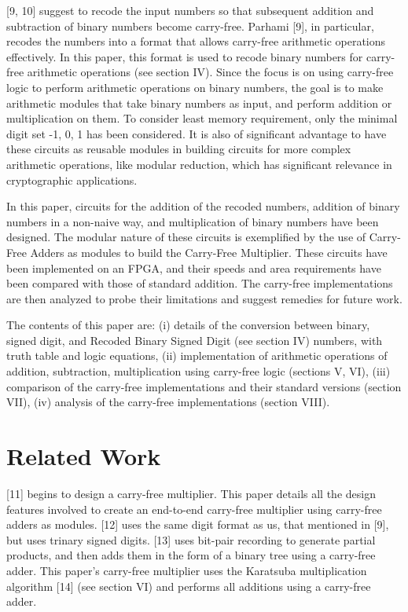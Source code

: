 \documentclass[conference]{IEEEtran_IBSS}
\begin{document}
[9, 10] suggest to recode the input numbers so that subsequent addition and subtraction of binary numbers become carry-free. Parhami [9], in particular, recodes the numbers into a format that allows carry-free arithmetic operations effectively. In this paper, this format is used to recode binary numbers for carry-free arithmetic operations (see section IV). Since the focus is on using carry-free logic to perform arithmetic operations on binary numbers, the goal is to make arithmetic modules that take binary numbers as input, and perform addition or multiplication on them. To consider least memory requirement, only the minimal digit set {-1, 0, 1} has been considered. It is also of significant advantage to have these circuits as reusable modules in building circuits for more complex arithmetic operations, like modular reduction, which has significant relevance in cryptographic applications.

In this paper, circuits for the addition of the recoded numbers, addition of binary numbers in a non-naive way, and multiplication of binary numbers have been designed. The modular nature of these circuits is exemplified by the use of Carry-Free Adders as modules to build the Carry-Free Multiplier. These circuits have been implemented on an FPGA, and their speeds and area requirements have been compared with those of standard addition. The carry-free implementations are then analyzed to probe their limitations and suggest remedies for future work.

The contents of this paper are: (i) details of the conversion between binary, signed digit, and Recoded Binary Signed Digit (see section IV) numbers, with truth table and logic equations, (ii) implementation of arithmetic operations of addition, subtraction, multiplication using carry-free logic (sections V, VI), (iii) comparison of the carry-free implementations and their standard versions (section VII), (iv) analysis of the carry-free implementations (section VIII).


\section{Related Work}

[11] begins to design a carry-free multiplier. This paper details all the design features involved to create an end-to-end carry-free multiplier using carry-free adders as modules. [12] uses the same digit format as us, that mentioned in [9], but uses trinary signed digits. [13] uses bit-pair recording to generate partial products, and then adds them in the form of a binary tree using a carry-free adder. This paper's carry-free multiplier uses the Karatsuba multiplication algorithm [14] (see section VI) and performs all additions using a carry-free adder.
\end{document}

